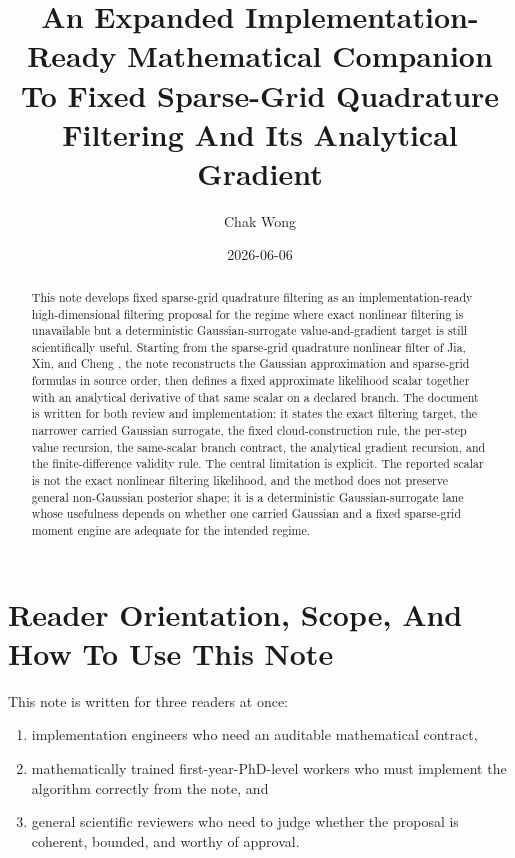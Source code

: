 \documentclass[11pt]{article}
\title{An Expanded Implementation-Ready Mathematical Companion To Fixed Sparse-Grid Quadrature Filtering And Its Analytical Gradient}
\author{Chak Wong}
\date{2026-06-06}
\numberwithin{equation}{section}
\begin{document}
\maketitle

\begin{abstract}
This note develops fixed sparse-grid quadrature filtering as an
implementation-ready high-dimensional filtering proposal for the regime where
exact nonlinear filtering is unavailable but a deterministic Gaussian-surrogate
value-and-gradient target is still scientifically useful.  Starting from the
sparse-grid quadrature nonlinear filter of Jia, Xin, and Cheng
\cite{jia2012sparsegrid}, the note reconstructs the Gaussian approximation and
sparse-grid formulas in source order, then defines a fixed approximate
likelihood scalar together with an analytical derivative of that same scalar on
a declared branch.  The document is written for both review and implementation:
it states the exact filtering target, the narrower carried Gaussian surrogate,
the fixed cloud-construction rule, the per-step value recursion, the
same-scalar branch contract, the analytical gradient recursion, and the
finite-difference validity rule.  The central limitation is explicit.  The
reported scalar is not the exact nonlinear filtering likelihood, and the method
does not preserve general non-Gaussian posterior shape; it is a deterministic
Gaussian-surrogate lane whose usefulness depends on whether one carried Gaussian
and a fixed sparse-grid moment engine are adequate for the intended regime.
\end{abstract}

\section{Reader Orientation, Scope, And How To Use This Note}
\label{sec:p33-reader-orientation}

This note is written for three readers at once:
\begin{enumerate}[leftmargin=0.28in]
  \item implementation engineers who need an auditable mathematical contract,
  \item mathematically trained first-year-PhD-level workers who must implement
  the algorithm correctly from the note, and
  \item general scientific reviewers who need to judge whether the proposal is
  coherent, bounded, and worthy of approval.
\end{enumerate}
\end{document}
